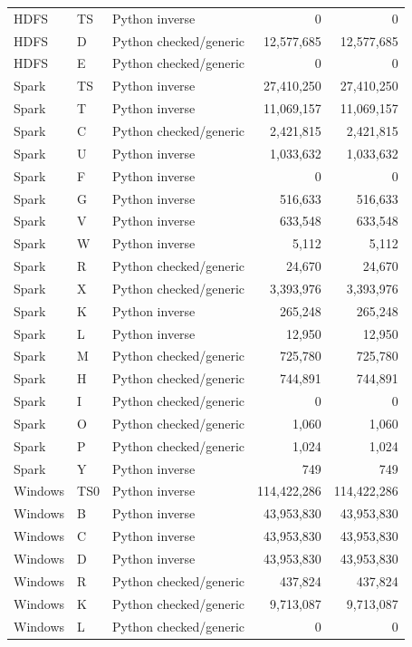 \begin{longtable}{lllrr}
HDFS & TS & Python inverse & 0 & 0 \\
HDFS & D & Python checked/generic & 12,577,685 & 12,577,685 \\
HDFS & E & Python checked/generic & 0 & 0 \\
Spark & TS & Python inverse & 27,410,250 & 27,410,250 \\
Spark & T & Python inverse & 11,069,157 & 11,069,157 \\
Spark & C & Python checked/generic & 2,421,815 & 2,421,815 \\
Spark & U & Python inverse & 1,033,632 & 1,033,632 \\
Spark & F & Python inverse & 0 & 0 \\
Spark & G & Python inverse & 516,633 & 516,633 \\
Spark & V & Python inverse & 633,548 & 633,548 \\
Spark & W & Python inverse & 5,112 & 5,112 \\
Spark & R & Python checked/generic & 24,670 & 24,670 \\
Spark & X & Python checked/generic & 3,393,976 & 3,393,976 \\
Spark & K & Python inverse & 265,248 & 265,248 \\
Spark & L & Python inverse & 12,950 & 12,950 \\
Spark & M & Python checked/generic & 725,780 & 725,780 \\
Spark & H & Python checked/generic & 744,891 & 744,891 \\
Spark & I & Python checked/generic & 0 & 0 \\
Spark & O & Python checked/generic & 1,060 & 1,060 \\
Spark & P & Python checked/generic & 1,024 & 1,024 \\
Spark & Y & Python inverse & 749 & 749 \\
Windows & TS0 & Python inverse & 114,422,286 & 114,422,286 \\
Windows & B & Python inverse & 43,953,830 & 43,953,830 \\
Windows & C & Python inverse & 43,953,830 & 43,953,830 \\
Windows & D & Python inverse & 43,953,830 & 43,953,830 \\
Windows & R & Python checked/generic & 437,824 & 437,824 \\
Windows & K & Python checked/generic & 9,713,087 & 9,713,087 \\
Windows & L & Python checked/generic & 0 & 0 \\

\end{longtable}
